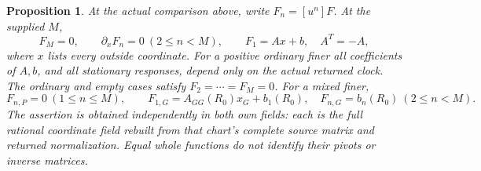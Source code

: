 \documentclass[11pt,a4paper]{amsart}
\numberwithin{equation}{section}
\theoremstyle{plain}
\newtheorem{proposition}[theorem]{Proposition}
\theoremstyle{definition}
\begin{document}
\begin{proposition}\label{ph:finite-block}
At the actual comparison above, write \(F_n=[u^n]F\).  At the supplied
\(M\),
\begin{equation}\label{ph:killing}
 F_M=0,\qquad \partial_xF_n=0\ (2\le n<M),\qquad
 F_1=A x+b,\quad A^T=-A,
\end{equation}
where \(x\) lists every outside coordinate.  For a positive ordinary
finer all coefficients of \(A,b\), and all stationary responses, depend
only on the actual returned clock.  The ordinary and empty cases satisfy
\(F_2=\cdots=F_M=0\).  For a mixed finer,
\begin{equation}\label{ph:mixed-finite}
 F_{n,P}=0\ (1\le n\le M),\qquad
 F_{1,G}=A_{GG}(R_0)x_G+b_1(R_0),\quad
 F_{n,G}=b_n(R_0)\ (2\le n<M).
\end{equation}
The assertion is obtained independently in both own fields: each is the
full rational coordinate field rebuilt from that chart's complete
source matrix and returned normalization.  Equal whole functions do
not identify their pivots or inverse matrices.
\end{proposition}
\end{document}
